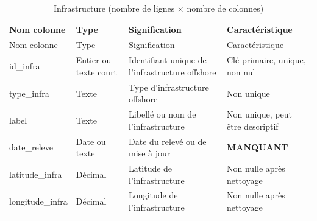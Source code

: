 \documentclass[mstat,12pt]{unswthesis}
\begin{document}
\begin{longtable}[]{@{}
  >{\centering\arraybackslash}p{}
  >{\centering\arraybackslash}p{}
  >{\centering\arraybackslash}p{}
  >{\centering\arraybackslash}p{}@{}}
\caption{Infrastructure (nombre de lignes \(\times\) nombre de
colonnes)}\tabularnewline
\toprule\noalign{}
\begin{minipage}[b]{\linewidth}\centering
Nom colonne
\end{minipage} & \begin{minipage}[b]{\linewidth}\centering
Type
\end{minipage} & \begin{minipage}[b]{\linewidth}\centering
Signification
\end{minipage} & \begin{minipage}[b]{\linewidth}\centering
Caractéristique
\end{minipage} \\
\midrule\noalign{}
\endfirsthead
\toprule\noalign{}
\begin{minipage}[b]{\linewidth}\centering
Nom colonne
\end{minipage} & \begin{minipage}[b]{\linewidth}\centering
Type
\end{minipage} & \begin{minipage}[b]{\linewidth}\centering
Signification
\end{minipage} & \begin{minipage}[b]{\linewidth}\centering
Caractéristique
\end{minipage} \\
\midrule\noalign{}
\endhead
\bottomrule\noalign{}
\endlastfoot
id\_infra & Entier ou texte court & Identifiant unique de
l'infrastructure offshore & Clé primaire, unique, non nul \\
type\_infra & Texte & Type d'infrastructure offshore & Non unique \\
label & Texte & Libellé ou nom de l'infrastructure & Non unique, peut
être descriptif \\
date\_releve & Date ou texte & Date du relevé ou de mise à jour &
\textbf{MANQUANT} \\
latitude\_infra & Décimal & Latitude de l'infrastructure & Non nulle
après nettoyage \\
longitude\_infra & Décimal & Longitude de l'infrastructure & Non nulle
après nettoyage \\
\end{longtable}
\end{document}
